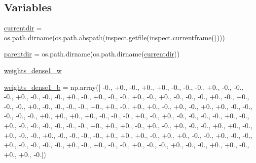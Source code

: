 \subsection*{Variables}
\begin{DoxyCompactItemize}
\item 
\hyperlink{namespacepybullet-gym_1_1pybulletgym_1_1examples_1_1roboschool-weights_1_1enjoy___t_f___atlas_py_bullet_env__v0__2017jul_a54b5f0d7aa9922670c82d80c59bc1401}{currentdir} = os.\+path.\+dirname(os.\+path.\+abspath(inspect.\+getfile(inspect.\+currentframe())))
\item 
\hyperlink{namespacepybullet-gym_1_1pybulletgym_1_1examples_1_1roboschool-weights_1_1enjoy___t_f___atlas_py_bullet_env__v0__2017jul_a7c193d41c94cfb2c34b5814ef2a761b0}{parentdir} = os.\+path.\+dirname(os.\+path.\+dirname(\hyperlink{namespacepybullet-gym_1_1pybulletgym_1_1examples_1_1roboschool-weights_1_1enjoy___t_f___atlas_py_bullet_env__v0__2017jul_a54b5f0d7aa9922670c82d80c59bc1401}{currentdir}))
\item 
\hyperlink{namespacepybullet-gym_1_1pybulletgym_1_1examples_1_1roboschool-weights_1_1enjoy___t_f___atlas_py_bullet_env__v0__2017jul_adebc59ec0936fa93c37a2dbe30b9909b}{weights\+\_\+dense1\+\_\+w}
\item 
\hyperlink{namespacepybullet-gym_1_1pybulletgym_1_1examples_1_1roboschool-weights_1_1enjoy___t_f___atlas_py_bullet_env__v0__2017jul_ace5f82221820b82780d3cf03dc0ea338}{weights\+\_\+dense1\+\_\+b} = np.\+array(\mbox{[} -\/0., +0., -\/0., +0., +0., -\/0., -\/0., -\/0., +0., -\/0., -\/0., -\/0., +0., -\/0., -\/0., -\/0., +0., -\/0., +0., -\/0., -\/0., +0., -\/0., +0., -\/0., -\/0., -\/0., +0., -\/0., +0., -\/0., -\/0., +0., -\/0., -\/0., -\/0., -\/0., +0., +0., -\/0., +0., +0., -\/0., +0., -\/0., +0., +0., -\/0., -\/0., -\/0., -\/0., -\/0., +0., +0., +0., +0., -\/0., -\/0., -\/0., +0., -\/0., +0., -\/0., -\/0., -\/0., -\/0., +0., -\/0., +0., -\/0., -\/0., -\/0., -\/0., -\/0., -\/0., +0., +0., +0., -\/0., +0., -\/0., +0., -\/0., -\/0., +0., +0., -\/0., +0., -\/0., -\/0., +0., -\/0., -\/0., -\/0., -\/0., +0., +0., +0., -\/0., +0., +0., -\/0., -\/0., +0., -\/0., -\/0., +0., -\/0., -\/0., -\/0., -\/0., +0., -\/0., +0., -\/0., -\/0., +0., -\/0., -\/0., +0., -\/0., -\/0., +0., +0., -\/0., +0., +0., -\/0.\mbox{]})

\end{DoxyCompactItemize}
